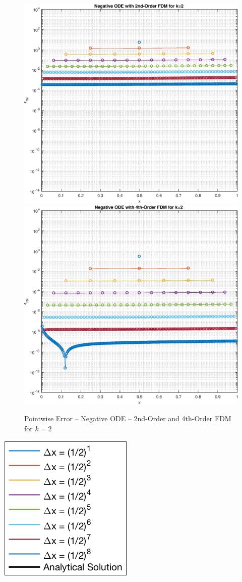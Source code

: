 \documentclass[10pt, reqno]{article}		%
\numberwithin{equation}{section}
\begin{document}
\begin{figure}[H]
	\begin{center}
		\includegraphics[width = 0.49\linewidth]{error_negative_ode_order_2_k_2}
		\includegraphics[width = 0.49\linewidth]{error_negative_ode_order_4_k_2}
		\caption{Pointwise Error -- Negative ODE -- 2nd-Order and 4th-Order FDM for $k = 2$}
	\end{center}
\end{figure}

\begin{center}
	\includegraphics[height = 0.25\linewidth]{legend}
\end{center}

\newpage
\end{document}
